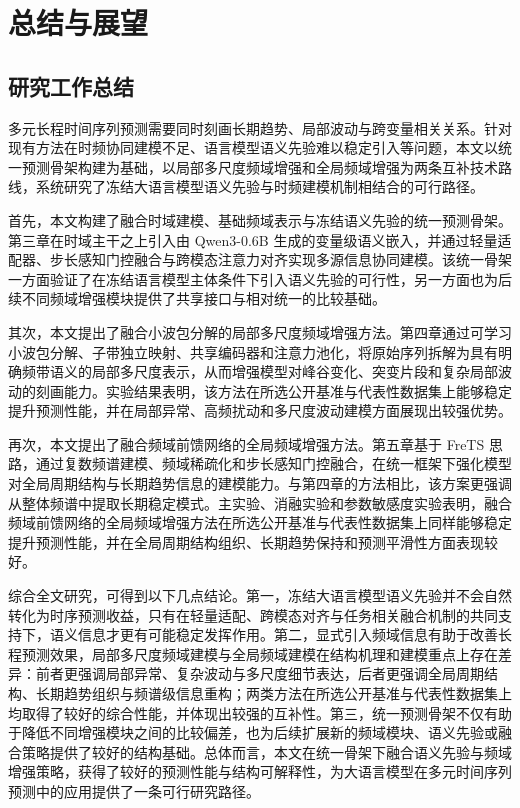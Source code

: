 \chapter{总结与展望}

\section{研究工作总结}
多元长程时间序列预测需要同时刻画长期趋势、局部波动与跨变量相关关系。针对现有方法在时频协同建模不足、语言模型语义先验难以稳定引入等问题，本文以统一预测骨架构建为基础，以局部多尺度频域增强和全局频域增强为两条互补技术路线，系统研究了冻结大语言模型语义先验与时频建模机制相结合的可行路径。

首先，本文构建了融合时域建模、基础频域表示与冻结语义先验的统一预测骨架。第三章在时域主干之上引入由 Qwen3-0.6B 生成的变量级语义嵌入，并通过轻量适配器、步长感知门控融合与跨模态注意力对齐实现多源信息协同建模。该统一骨架一方面验证了在冻结语言模型主体条件下引入语义先验的可行性，另一方面也为后续不同频域增强模块提供了共享接口与相对统一的比较基础。

其次，本文提出了融合小波包分解的局部多尺度频域增强方法。第四章通过可学习小波包分解、子带独立映射、共享编码器和注意力池化，将原始序列拆解为具有明确频带语义的局部多尺度表示，从而增强模型对峰谷变化、突变片段和复杂局部波动的刻画能力。实验结果表明，该方法在所选公开基准与代表性数据集上能够稳定提升预测性能，并在局部异常、高频扰动和多尺度波动建模方面展现出较强优势。

再次，本文提出了融合频域前馈网络的全局频域增强方法。第五章基于 FreTS 思路，通过复数频谱建模、频域稀疏化和步长感知门控融合，在统一框架下强化模型对全局周期结构与长期趋势信息的建模能力。与第四章的方法相比，该方案更强调从整体频谱中提取长期稳定模式。主实验、消融实验和参数敏感度实验表明，融合频域前馈网络的全局频域增强方法在所选公开基准与代表性数据集上同样能够稳定提升预测性能，并在全局周期结构组织、长期趋势保持和预测平滑性方面表现较好。

综合全文研究，可得到以下几点结论。第一，冻结大语言模型语义先验并不会自然转化为时序预测收益，只有在轻量适配、跨模态对齐与任务相关融合机制的共同支持下，语义信息才更有可能稳定发挥作用。第二，显式引入频域信息有助于改善长程预测效果，局部多尺度频域建模与全局频域建模在结构机理和建模重点上存在差异：前者更强调局部异常、复杂波动与多尺度细节表达，后者更强调全局周期结构、长期趋势组织与频谱级信息重构；两类方法在所选公开基准与代表性数据集上均取得了较好的综合性能，并体现出较强的互补性。第三，统一预测骨架不仅有助于降低不同增强模块之间的比较偏差，也为后续扩展新的频域模块、语义先验或融合策略提供了较好的结构基础。总体而言，本文在统一骨架下融合语义先验与频域增强策略，获得了较好的预测性能与结构可解释性，为大语言模型在多元时间序列预测中的应用提供了一条可行研究路径。

